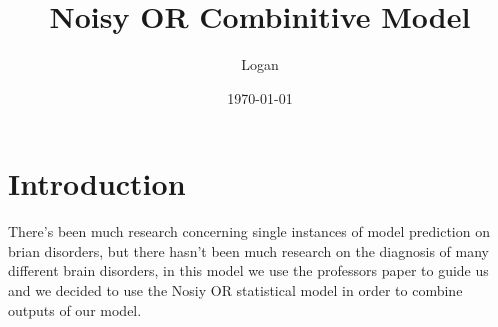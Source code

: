 \documentclass{article}
\author{Logan}
\date{\today}
\title{Noisy OR Combinitive Model}
\begin{document}
\maketitle
\newpage

\section{Introduction}
There's been much research concerning single instances of model prediction on brian
disorders, but there hasn't been much research on the diagnosis of many different brain
disorders, in this model we use the professors paper to guide us and we decided to use
the Nosiy OR statistical model in order to combine outputs of our model.
\end{document}
